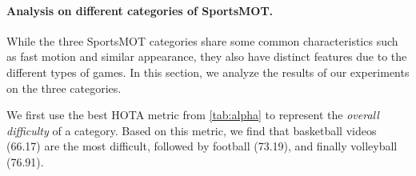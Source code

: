\documentclass[10pt,twocolumn,letterpaper]{article}
\begin{document}
{\begin{table*}[ht]
\vspace{-3mm}
\caption{Comparison of the state-of-the-art methods under the “private detector” protocol on MOT17-test set and MOT17-val set.}
\vspace{-4mm}
\label{fig:mot17testval}
\end{table*}

\vspace{-4mm}
\paragraph{Analysis on different categories of SportsMOT.}
While the three SportsMOT categories share some common characteristics such as fast motion and similar appearance, they also have distinct features due to the different types of games. In this section, we analyze the results of our experiments on the three categories.

We first use the best HOTA metric from \cref{tab:alpha} to represent the \textit{overall difficulty} of a category. Based on this metric, we find that basketball videos (66.17) are the most difficult, followed by football (73.19), and finally volleyball (76.91).

}
\end{document}
